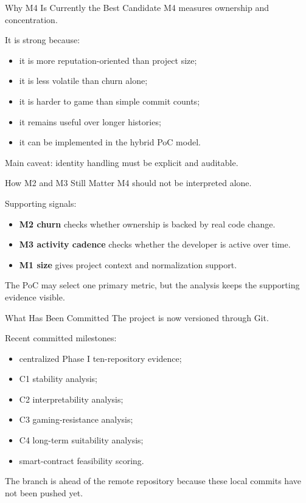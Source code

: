 \documentclass[aspectratio=169,11pt]{beamer}
\newcommand{\metric}[1]{\textbf{#1}}
\begin{document}
\begin{frame}{Why M4 Is Currently the Best Candidate}
  M4 measures ownership and concentration.

  \vspace{0.2cm}
  It is strong because:
  \begin{itemize}
    \item it is more reputation-oriented than project size;
    \item it is less volatile than churn alone;
    \item it is harder to game than simple commit counts;
    \item it remains useful over longer histories;
    \item it can be implemented in the hybrid PoC model.
  \end{itemize}

  \vspace{0.2cm}
  Main caveat: identity handling must be explicit and auditable.
\end{frame}

\begin{frame}{How M2 and M3 Still Matter}
  M4 should not be interpreted alone.

  \vspace{0.2cm}
  Supporting signals:
  \begin{itemize}
    \item \metric{M2 churn} checks whether ownership is backed by real code change.
    \item \metric{M3 activity cadence} checks whether the developer is active over time.
    \item \metric{M1 size} gives project context and normalization support.
  \end{itemize}

  \vspace{0.3cm}
  The PoC may select one primary metric, but the analysis keeps the supporting evidence visible.
\end{frame}

\begin{frame}{What Has Been Committed}
  The project is now versioned through Git.

  \vspace{0.2cm}
  Recent committed milestones:
  \begin{itemize}
    \item centralized Phase I ten-repository evidence;
    \item C1 stability analysis;
    \item C2 interpretability analysis;
    \item C3 gaming-resistance analysis;
    \item C4 long-term suitability analysis;
    \item smart-contract feasibility scoring.
  \end{itemize}

  \vspace{0.2cm}
  The branch is ahead of the remote repository because these local commits have not been pushed yet.
\end{frame}
\end{document}
